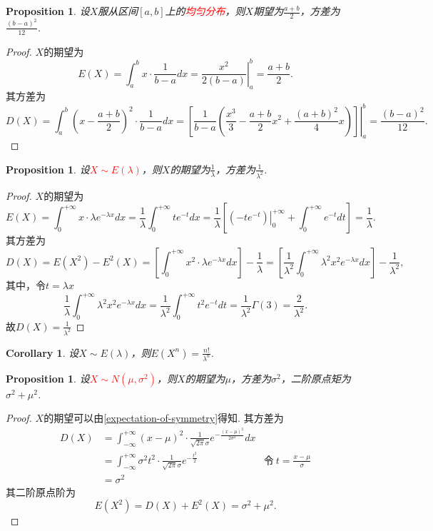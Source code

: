 \documentclass{article}
\newtheorem{corollary}[theorem]{Corollary}
\newtheorem{proposition}[theorem]{Proposition}
\newcommand{\redt}[1]{\textcolor{red}{#1}}
\begin{document}
\begin{proposition}
\rm 设$X$服从区间$[a,b]$上的\redt{均匀分布}，则$X$期望为$\frac{a+b}{2}$，方差为$\frac{(b-a)^2}{12}$.
\end{proposition}

\begin{proof}
\rm $X$的期望为
$$
E(X) = \int_{a}^{b} x\cdot\frac{1}{b-a}dx = \left. \frac{x^2}{2(b-a)} \right\vert_{a}^{b} = \frac{a+b}{2}. 
$$
其方差为
$$
D(X) = \int_{a}^{b} \left(x-\frac{a+b}{2}\right)^2 \cdot\frac{1}{b-a}dx = \left. \left[ \frac{1}{b-a} \left( \frac{x^3}{3} - \frac{a+b}{2}x^2 +\frac{(a+b)^2}{4}x  \right)\right]\right\vert_{a}^{b} = \frac{(b-a)^2}{12}.
$$
\end{proof}

\begin{proposition}
\rm 设\redt{$X \sim E(\lambda)$}，则$X$的期望为$\frac{1}{\lambda}$，方差为$\frac{1}{\lambda^2}$. 
\end{proposition}

\begin{proof}
$X$的期望为
$$
E(X) = \int_{0}^{+\infty} x\cdot \lambda e^{-\lambda x} dx = \frac{1}{\lambda}\int_{0}^{+\infty} t e^{-t} dx = \frac{1}{\lambda} \left[ \left. (-te^{-t}) \right\vert_{0}^{+\infty} + \int_{0}^{+\infty} e^{-t}dt \right] = \frac{1}{\lambda}.
$$
其方差为
$$
D(X) = E(X^2) - E^2(X) = \left[\int_{0}^{+\infty} x^2 \cdot \lambda e^{-\lambda x} dx \right] - \frac{1}{\lambda} = \left[ \frac{1}{\lambda^2} \int_{0}^{+\infty} \lambda^2 x^2 e^{-\lambda x}dx \right]-\frac{1}{\lambda^2},
$$
其中，令$t = \lambda x$
$$
\frac{1}{\lambda} \int_{0}^{+\infty} \lambda^2 x^2 e^{-\lambda x}dx = \frac{1}{\lambda^2} \int_{0}^{+\infty} t^2e^{-t}dt = \frac{1}{\lambda^2} \Gamma(3) =\frac{2}{\lambda^2}.
$$
故$D(X)=\frac{1}{\lambda^2}$
\end{proof}

\begin{corollary}
\rm 设$X \sim E(\lambda)$，则$E(X^n) = \frac{n!}{\lambda^n}$.
\end{corollary}

\begin{proposition}
\rm 设\redt{$X \sim N(\mu,\sigma^2)$}，则$X$的期望为$\mu$，方差为$\sigma^2$，二阶原点矩为$\sigma^2+\mu^2$.
\end{proposition}

\begin{proof}
$X$的期望可以由\ref{expectation-of-symmetry}得知. 其方差为
$$
\begin{array}{llr}
D(X) &= \int_{-\infty}^{+\infty} (x-\mu)^2 \cdot \frac{1}{\sqrt{2\pi}\sigma} e^{-\frac{(x-\mu)^2}{2\sigma^2}}dx  \\
&= \int_{-\infty}^{+\infty} \sigma^2 t^2 \cdot \frac{1}{\sqrt{2\pi}\sigma} e^{-\frac{t^2}{2}} & \text{令}~t=\frac{x-\mu}{\sigma} \\
&=\sigma^2
\end{array}
$$
其二阶原点阶为
$$
E(X^2) = D(X)+E^2(X) =  \sigma^2 + \mu^2.
$$
\end{proof}
\end{document}
